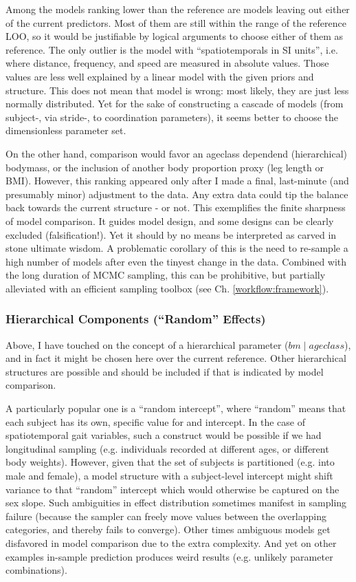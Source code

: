 Among the models ranking lower than the reference are models leaving out either of the current predictors.
Most of them are still within the range of the reference LOO, so it would be justifiable by logical arguments to choose either of them as reference.
The only outlier is the model with ``spatiotemporals in SI units'', i.e. where distance, frequency, and speed are measured in absolute values.
Those values are less well explained by a linear model with the given priors and structure.
This does not mean that model is wrong: most likely, they are just less normally distributed.
Yet for the sake of constructing a cascade of models (from subject-, via stride-, to coordination parameters), it seems better to choose the dimensionless parameter set.


On the other hand, comparison would favor an ageclass dependend (hierarchical) bodymass, or the inclusion of another body proportion proxy (leg length or BMI).
However, this ranking appeared only after I made a final, last-minute (and presumably minor) adjustment to the data.
Any extra data could tip the balance back towards the current structure - or not.
This exemplifies the finite sharpness of model comparison.
It guides model design, and some designs can be clearly excluded (falsification!).
Yet it should by no means be interpreted as carved in stone ultimate wisdom.
A problematic corollary of this is the need to re-sample a high number of models after even the tinyest change in the data.
Combined with the long duration of MCMC sampling, this can be prohibitive, but partially alleviated with an efficient sampling toolbox (see Ch. \ref{workflow:framework}).


\subsubsection{Hierarchical Components (``Random'' Effects)}
\label{sec:org86c8327}
Above, I have touched on the concept of a hierarchical parameter (\(bm\mid ageclass\)), and in fact it might be chosen here over the current reference.
Other hierarchical structures are possible and should be included if that is indicated by model comparison.

A particularly popular one is a ``random intercept'', where ``random'' means that each subject has its own, specific value for and intercept.
In the case of spatiotemporal gait variables, such a construct would be possible if we had longitudinal sampling (e.g. individuals recorded at different ages, or different body weights).
However, given that the set of subjects is partitioned (e.g. into male and female), a model structure with a subject-level intercept might shift variance to that ``random'' intercept which would otherwise be captured on the sex slope.
Such ambiguities in effect distribution sometimes manifest in sampling failure (because the sampler can freely move values between the overlapping categories, and thereby fails to converge).
Other times ambiguous models get disfavored in model comparison due to the extra complexity.
And yet on other examples in-sample prediction produces weird results (e.g. unlikely parameter combinations).

